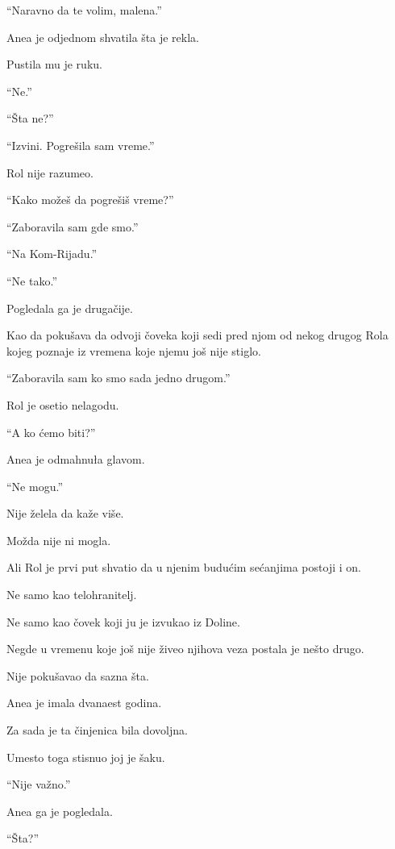 ``Naravno da te volim, malena.''

Anea je odjednom shvatila šta je rekla.

Pustila mu je ruku.

``Ne.''

``Šta ne?''

``Izvini. Pogrešila sam vreme.''

\bigskip

Rol nije razumeo.

``Kako možeš da pogrešiš vreme?''

``Zaboravila sam gde smo.''

``Na Kom-Rijadu.''

``Ne tako.''

\bigskip

Pogledala ga je drugačije.

Kao da pokušava da odvoji čoveka koji sedi pred njom od nekog drugog Rola kojeg poznaje iz vremena koje njemu još nije stiglo.

\bigskip

``Zaboravila sam ko smo sada jedno drugom.''

Rol je osetio nelagodu.

``A ko ćemo biti?''

Anea je odmahnuła glavom.

``Ne mogu.''

\bigskip

Nije želela da kaže više.

Možda nije ni mogla.

\bigskip

Ali Rol je prvi put shvatio da u njenim budućim sećanjima postoji i on.

Ne samo kao telohranitelj.

Ne samo kao čovek koji ju je izvukao iz Doline.

Negde u vremenu koje još nije živeo njihova veza postala je nešto drugo.

\bigskip

Nije pokušavao da sazna šta.

Anea je imala dvanaest godina.

Za sada je ta činjenica bila dovoljna.

\bigskip

Umesto toga stisnuo joj je šaku.

``Nije važno.''

Anea ga je pogledala.

``Šta?''

